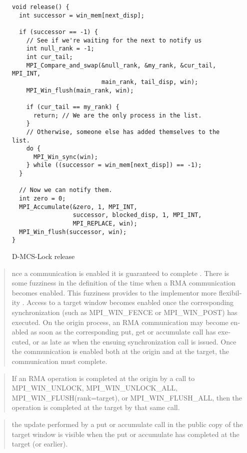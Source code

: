 \begin{figure}
    \begin{lstlisting}
void release() {
  int successor = win_mem[next_disp];

  if (successor == -1) {
    // See if we're waiting for the next to notify us
    int null_rank = -1;
    int cur_tail;
    MPI_Compare_and_swap(&null_rank, &my_rank, &cur_tail, MPI_INT,
                         main_rank, tail_disp, win);
    MPI_Win_flush(main_rank, win);

    if (cur_tail == my_rank) {
      return; // We are the only process in the list.
    }
    // Otherwise, someone else has added themselves to the list.
    do {
      MPI_Win_sync(win);
    } while ((successor = win_mem[next_disp]) == -1);
  }

  // Now we can notify them.
  int zero = 0;
  MPI_Accumulate(&zero, 1, MPI_INT,
                 successor, blocked_disp, 1, MPI_INT,
                 MPI_REPLACE, win);
  MPI_Win_flush(successor, win);
}
    \end{lstlisting}
    \caption{D-MCS-Lock release}
    \label{fig:dmcs_release}
\end{figure}

\foreignblockcquote{english}[Kapitel 11.7.3, S. 462]{MPI-3.1}{%
    nce a communication is enabled it is guaranteed to complete \textelp{}.
    There is some fuzziness in the definition of the time when a RMA communication
    becomes enabled. This fuzziness provides to the implementor more flexibility \textelp{}.
    Access to a target window becomes enabled once the corresponding
    synchronization (such as MPI\_WIN\_FENCE or MPI\_WIN\_POST) has executed. On
    the origin process, an RMA communication may become enabled as soon as the corresponding
    put, get or accumulate call has executed, or as late as when the ensuing synchronization
    call is issued. Once the communication is enabled both at the origin and at the target, the
    communication must complete.}

\foreignblockcquote{english}[Kapitel 11.7, S. 453]{MPI-3.1}{%
    If an RMA operation is completed at the origin by a call to MPI\_WIN\_UNLOCK,
    MPI\_WIN\_UNLOCK\_ALL, MPI\_WIN\_FLUSH(rank=target), or
    MPI\_WIN\_FLUSH\_ALL, then the operation is completed at the target by that same
    call.}

\foreignblockcquote{english}[Kapitel 11.7, S. 453]{MPI-3.1}{%
    the update performed
    by a put or accumulate call in the public copy of the target window is visible when the put
    or accumulate has completed at the target (or earlier).}

